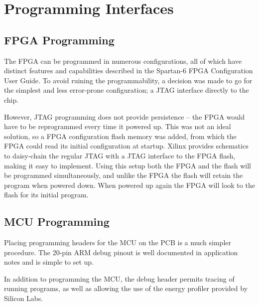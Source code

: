 
\section{Programming Interfaces}

\subsection{FPGA Programming}
The FPGA can be programmed in numerous configurations, all of which have
distinct features and capabilities described in the
Spartan-6 FPGA Configuration User Guide\cite{fpga:config-user-guide}. To avoid ruining the programmability, a
decision was made to go for the simplest and less error-prone configuration; a
JTAG interface directly to the chip.

However, JTAG programming does not provide persistence -- the FPGA would have to
be reprogrammed every time it powered up. This was not an ideal solution, so a
FPGA configuration flash memory was added, from which the FPGA could read its
initial configuration at startup. Xilinx provides schematics to daisy-chain the
regular JTAG with a JTAG interface to the FPGA flash, making it easy to
implement. Using this setup both the FPGA and the flash will be programmed
simultaneously, and unlike the FPGA the flash will retain the program when
powered down. When powered up again the FPGA will look to the flash for its
initial program.

\subsection{MCU Programming}
Placing programming headers for the MCU on the PCB is a much simpler procedure.
The 20-pin ARM debug pinout is well documented in application notes and is
simple to set up.

In addition to programming the MCU, the debug header permits tracing of running
programs, as well as allowing the use of the energy profiler provided by Silicon Labs.
